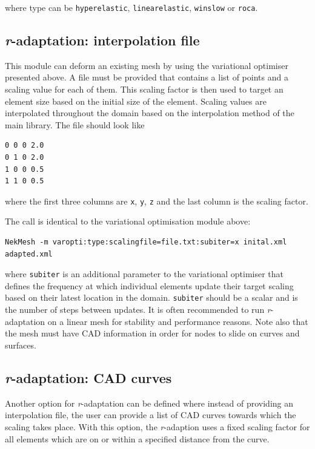 where type can be \texttt{hyperelastic}, \texttt{linearelastic},
\texttt{winslow} or \texttt{roca}.

\subsection{\emph{r}-adaptation: interpolation file}
This module can deform an existing mesh by using the variational optimiser
presented above. A file must be provided that contains a list of points
and a scaling value for each of them. This scaling factor is then used to
target an element size based on the initial size of the element. Scaling
values are interpolated throughout the domain based on the interpolation
method of the main library. The file should look like
\begin{lstlisting}
0 0 0 2.0
0 1 0 2.0
1 0 0 0.5
1 1 0 0.5
\end{lstlisting}
where the first three columns are \texttt{x}, \texttt{y}, \texttt{z} and
the last column is the scaling factor.

The call is identical to the variational optimisation module above:
\begin{lstlisting}[style=BashInputStyle]
  NekMesh -m varopti:type:scalingfile=file.txt:subiter=x inital.xml adapted.xml
\end{lstlisting}
where \texttt{subiter} is an additional parameter to the variational
optimiser that defines the frequency at which individual elements
update their target scaling based on their latest location in the domain.
\texttt{subiter} should be a scalar and is the number of steps between updates.
It is often recommended to run \emph{r}-adaptation on a linear mesh for
stability and performance reasons. Note also that the mesh must have
CAD information in order for nodes to slide on curves and surfaces.

\subsection{\emph{r}-adaptation: CAD curves}
Another option for \emph{r}-adaptation can be defined where instead of providing
an interpolation file, the user can provide a list of CAD curves towards which
the scaling takes place. With this option, the \emph{r}-adaption uses a fixed
scaling factor for all elements which are on or within a specified distance from
the curve.

